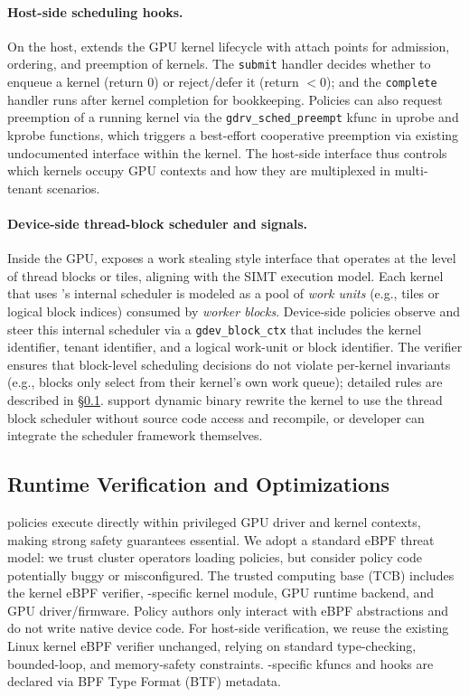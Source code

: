 \paragraph{Host-side scheduling hooks.}
On the host, \sys extends the GPU kernel lifecycle with attach points for admission, ordering, and preemption of kernels. The \texttt{submit} handler decides whether to enqueue a kernel (return 0) or reject/defer it (return $<$0); and the \texttt{complete} handler runs after kernel completion for bookkeeping. Policies can also request preemption of a running kernel via the \texttt{gdrv\_sched\_preempt} kfunc in uprobe and kprobe functions, which triggers a best-effort cooperative preemption via existing undocumented\cite{gpreempt} interface within the kernel. The host-side interface thus controls which kernels occupy GPU contexts and how they are multiplexed in multi-tenant scenarios.


\paragraph{Device-side thread-block scheduler and signals.} Inside the GPU, \sys exposes a work stealing style interface that operates at the level of thread blocks or tiles, aligning with the SIMT execution model. Each kernel that uses \sys's internal scheduler is modeled as a pool of \emph{work units} (e.g., tiles or logical block indices) consumed by \emph{worker blocks}. Device-side policies observe and steer this internal scheduler via a \texttt{gdev\_block\_ctx} that includes the kernel identifier, tenant identifier, and a logical work-unit or block identifier. The verifier ensures that block-level scheduling decisions do not violate per-kernel invariants (e.g., blocks only select from their kernel's own work queue); detailed rules are described in \S\ref{sec:verification}. \sys support dynamic binary rewrite the kernel to use the thread block scheduler without source code access and recompile, or developer can integrate the scheduler framework themselves.


\subsection{Runtime Verification and Optimizations}
\label{sec:verification}

\sys policies execute directly within privileged GPU driver and kernel contexts, making strong safety guarantees essential. We adopt a standard eBPF threat model: we trust cluster operators loading policies, but consider policy code potentially buggy or misconfigured. The trusted computing base (TCB) includes the kernel eBPF verifier, \sys-specific kernel module, GPU runtime backend, and GPU driver/firmware. Policy authors only interact with eBPF abstractions and do not write native device code. For host-side verification, we reuse the existing Linux kernel eBPF verifier unchanged, relying on standard type-checking, bounded-loop, and memory-safety constraints. \sys-specific kfuncs and hooks are declared via BPF Type Format (BTF) metadata.

